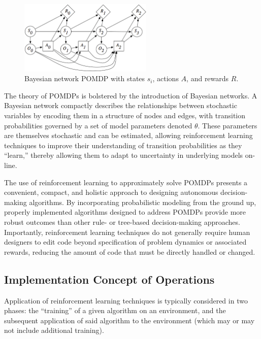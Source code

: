 \documentclass[paper,11pt]{AAS}		%
\begin{document}
\begin{figure}[!b]
	\centering
	\includegraphics[width=2.5in]{classicalPOMDP.png}
	\caption{Bayesian network POMDP with states $s_i$, actions $A$, and rewards $R$. }
	\label{fig:classicalPOMDP}
\end{figure}

The theory of POMDPs is bolstered by the introduction of Bayesian networks. A Bayesian network compactly describes the relationships between stochastic variables by encoding them in a structure of nodes and edges, with transition probabilities governed by a set of model parameters denoted $\theta$. These parameters are themselves stochastic and can be estimated, allowing reinforcement learning techniques to improve their understanding of transition probabilities as they ``learn,'' thereby allowing them to adapt to uncertainty in underlying models on-line.  

The use of reinforcement learning to approximately solve POMDPs presents a convenient, compact, and holistic approach to designing autonomous decision-making algorithms. By incorporating probabilistic modeling from the ground up, properly implemented algorithms designed to address POMDPs provide more robust outcomes than other rule- or tree-based decision-making approaches. Importantly, reinforcement learning techniques do not generally require human designers to edit code beyond specification of problem dynamics or associated rewards, reducing the amount of code that must be directly handled or changed. 


\subsection{Implementation Concept of Operations}

Application of reinforcement learning techniques is typically considered in two phases: the ``training'' of a given algorithm on an environment, and the subsequent application of said algorithm to the environment (which may or may not include additional training). 
\end{document}
